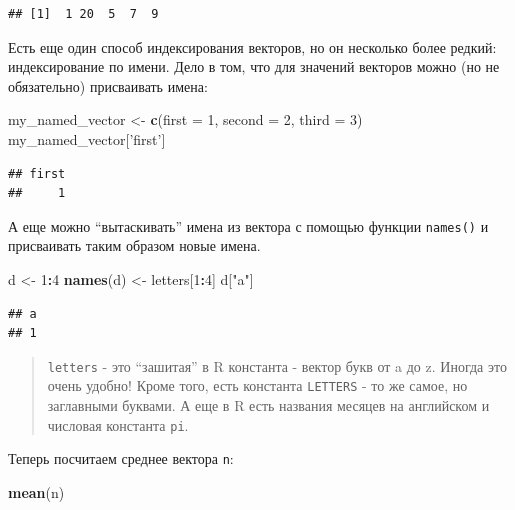 \documentclass[
]{book}
\newenvironment{Shaded}{\begin{snugshade}}{\end{snugshade}}
\newcommand{\DataTypeTok}[1]{\textcolor[rgb]{0.13,0.29,0.53}{#1}}
\newcommand{\DecValTok}[1]{\textcolor[rgb]{0.00,0.00,0.81}{#1}}
\newcommand{\KeywordTok}[1]{\textcolor[rgb]{0.13,0.29,0.53}{\textbf{#1}}}
\newcommand{\NormalTok}[1]{#1}
\newcommand{\OperatorTok}[1]{\textcolor[rgb]{0.81,0.36,0.00}{\textbf{#1}}}
\newcommand{\StringTok}[1]{\textcolor[rgb]{0.31,0.60,0.02}{#1}}
\begin{document}
\begin{verbatim}
## [1]  1 20  5  7  9
\end{verbatim}

Есть еще один способ индексирования векторов, но он несколько более редкий: индексирование по имени. Дело в том, что для значений векторов можно (но не обязательно) присваивать имена:

\begin{Shaded}
\begin{Highlighting}[]
\NormalTok{my_named_vector <-}\StringTok{ }\KeywordTok{c}\NormalTok{(}\DataTypeTok{first =} \DecValTok{1}\NormalTok{,}
                     \DataTypeTok{second =} \DecValTok{2}\NormalTok{,}
                     \DataTypeTok{third =} \DecValTok{3}\NormalTok{)}
\NormalTok{                     my_named_vector[}\StringTok{'first'}\NormalTok{]}
\end{Highlighting}
\end{Shaded}

\begin{verbatim}
## first 
##     1
\end{verbatim}

А еще можно ``вытаскивать'' имена из вектора с помощью функции \texttt{names()} и присваивать таким образом новые имена.

\begin{Shaded}
\begin{Highlighting}[]
\NormalTok{d <-}\StringTok{ }\DecValTok{1}\OperatorTok{:}\DecValTok{4}
\KeywordTok{names}\NormalTok{(d) <-}\StringTok{ }\NormalTok{letters[}\DecValTok{1}\OperatorTok{:}\DecValTok{4}\NormalTok{]}
\NormalTok{d[}\StringTok{"a"}\NormalTok{]}
\end{Highlighting}
\end{Shaded}

\begin{verbatim}
## a 
## 1
\end{verbatim}

\begin{quote}
\texttt{letters} - это ``зашитая'' в R константа - вектор букв от a до z. Иногда это очень удобно! Кроме того, есть константа \texttt{LETTERS} - то же самое, но заглавными буквами. А еще в R есть названия месяцев на английском и числовая константа \texttt{pi}.
\end{quote}

Теперь посчитаем среднее вектора \texttt{n}:

\begin{Shaded}
\begin{Highlighting}[]
\KeywordTok{mean}\NormalTok{(n)}
\end{Highlighting}
\end{Shaded}
\end{document}
